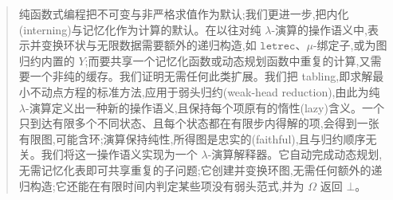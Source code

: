 \begin{CJK*}{UTF8}{gbsn}
  \ifTablambdaLNCS
  \maketitle
  \fi
  \ifTablambdaBody
  \begin{abstract}
    \ifPaperChinese
    纯函数式编程把不可变与非严格求值作为默认;我们更进一步,把内化(interning)与记忆化作为计算的默认。在以往对纯 $\lambda$-演算的操作语义中,表示并变换环状与无限数据需要额外的递归构造,如 $\texttt{letrec}$、$\mu$-绑定子,或为图归约内置的 $Y$;而要共享一个记忆化函数或动态规划函数中重复的计算,又需要一个非纯的缓存。我们证明无需任何此类扩展。我们把 tabling,即求解最小不动点方程的标准方法,应用于弱头归约(weak-head reduction),由此为纯 $\lambda$-演算定义出一种新的操作语义,且保持每个项原有的惰性(lazy)含义。一个只到达有限多个不同状态、且每个状态都在有限步内得解的项,会得到一张有限图,可能含环;演算保持纯性,所得图是忠实的(faithful),且与归约顺序无关。我们将这一操作语义实现为一个 $\lambda$-演算解释器。它自动完成动态规划,无需记忆化表即可共享重复的子问题;它创建并变换环图,无需任何额外的递归构造;它还能在有限时间内判定某些项没有弱头范式,并为 $\Omega$ 返回 $\bot$。


\end{abstract}
\end{CJK*}
